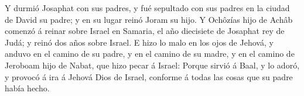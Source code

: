  Y durmió Josaphat con sus padres, y fué sepultado con sus
padres en la ciudad de David su padre; y en su lugar reinó Joram su
hijo.  Y Ochôzías hijo de Achâb comenzó á reinar sobre
Israel en Samaria, el año diecisiete de Josaphat rey de Judá; y reinó
dos años sobre Israel.  E hizo lo malo en los ojos de
Jehová, y anduvo en el camino de su padre, y en el camino de su madre, y
en el camino de Jeroboam hijo de Nabat, que hizo pecar á Israel: Porque
sirvió á Baal, y lo adoró, y provocó á ira á Jehová Dios de Israel,
conforme á todas las cosas que su padre había hecho.
